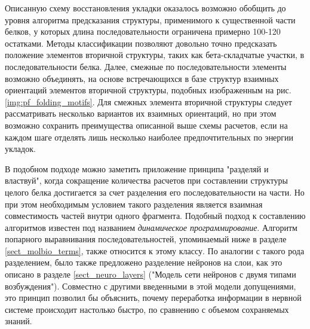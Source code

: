 Описанную схему восстановления укладки оказалось возможно обобщить до уровня алгоритма предсказания структуры, применимого к существенной части белков, у которых длина последовательности ограничена примерно 100-120 остатками. Методы классификации позволяют довольно точно предсказать положение элементов вторичной структуры, таких как бета-складчатые участки, в последовательности белка. Далее, смежные по последовательности элементы возможно объединять, на основе встречающихся в базе структур взаимных ориентаций элементов вторичной структуры, подобных изображенным на рис. \ref{img:pf_folding_motifs}. Для смежных элемента вторичной структуры следует рассматривать несколько вариантов их взаимных ориентаций, но при этом возможно сохранить преимущества описанной выше схемы расчетов, если на каждом шаге отделять лишь несколько наиболее предпочтительных по энергии укладок.

В подобном подходе можно заметить приложение принципа "разделяй и властвуй", когда сокращение количества расчетов при составлении структуры целого белка достигается за счет разделения его последовательности на части. Но при этом необходимым условием такого разделения является взаимная совместимость частей внутри одного фрагмента. Подобный подход к составлению алгоритмов известен под названием \textit{динамическое программирование}. Алгоритм попарного выравнивания последовательностей, упоминаемый ниже в разделе \ref{sect_molbio_terms}, также относится к этому классу. По аналогии с такого рода разделением, было также предложено разделение нейронов на слои, как это описано в разделе \ref{sect_neuro_layers} ("Модель сети нейронов с двумя типами возбуждения"). Совместно с другими введенными в этой модели допущениями, это принцип позволил бы объяснить, почему переработка информации в нервной системе происходит настолько быстро, по сравнению с объемом сохраняемых знаний.


